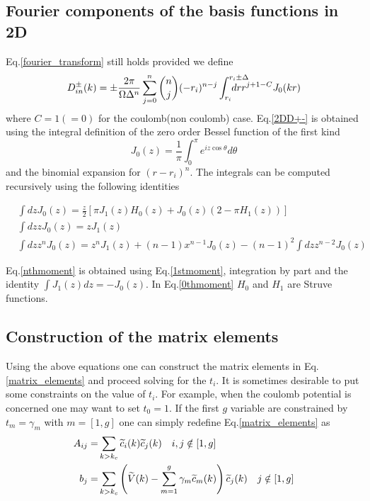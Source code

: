 \subsection{Fourier components of the basis functions in 2D}
Eq.\ref{fourier_transform} still holds provided we define  
\begin{equation}
D^\pm_{in}(k)=\pm\frac{2\pi}{\Omega \Delta^n} \sum_{j=0}^n \binom{n}{j}
(-r_i)^{n-j}\int_{r_i}^{r_i\pm \Delta}\negthickspace \negthickspace 
\negthickspace \negthickspace \negthickspace \negthickspace \negthickspace 
dr r^{j+1-C} J_0(kr)
\label{2DD+-}
\end{equation}
where $C=1(=0)$ for the coulomb(non coulomb) case.
Eq.\ref{2DD+-} is obtained using the integral definition of the 
zero order Bessel function of the first kind 
\begin{equation}
J_0(z)=\frac{1}{\pi}\int_0^\pi e^{iz\cos\theta}d\theta
\end{equation}
and the binomial expansion for $(r-r_i)^n$.
The integrals can be computed recursively using the following identities
\begin{center}
\begin{minipage}{0.7\textwidth}
\begin{align}
&\int dz J_0(z)=\frac{z}{2}\left[\pi J_1(z)H_0(z)+J_0(z)(2-\pi H_1(z))\right]
\label{0thmoment}\\
&\int dz z J_0(z)= z J_1(z)
\label{1stmoment}\\
&\int dz z^n J_0(z)= z^nJ_1(z)+(n-1)x^{n-1}J_0(z)
-(n-1)^2\int dz z^{n-2} J_0(z)
\label{nthmoment}
\end{align}
\end{minipage}
\end{center}
Eq.\ref{nthmoment} is obtained using Eq.\ref{1stmoment}, integration by part and 
the identity $\int J_1(z) dz =-J_0(z)$. In Eq.\ref{0thmoment} $H_0$ and $H_1$ are Struve functions.

\subsection{Construction of the matrix elements}
Using the above equations one can construct the matrix elements in Eq.\ref{matrix_elements}
and proceed solving for the $t_i$. It is sometimes desirable to put some constraints
on the value of $t_i$. For example, when the coulomb potential is concerned one may 
want to set $t_{0}=1$. If the first $g$ variable are constrained by $t_{m}=\gamma_m$ 
with $m=[1,g]$ one can simply redefine Eq.\ref{matrix_elements} as
\begin{equation}
\begin{split}
A_{ij}=&\sum_{k>k_c} \tc_i(k)\tc_j(k)  \quad i,j\notin[1,g] \\
b_j=&\sum_{k>k_c} \left(\tV(k)-\sum_{m=1}^g \gamma_m \tc_m(k)\right)\tc_j(k)\quad j\notin[1,g]
\end{split}
\label{modified_matrix_elements}
\end{equation}



